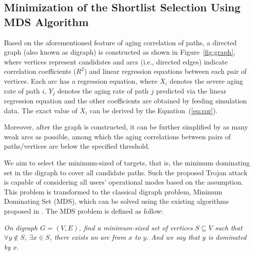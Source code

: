 \subsection{Minimization of the Shortlist Selection Using MDS Algorithm}
\label{sec:frame:mds}
Based on the aforementioned feature of aging correlation of paths, a directed graph (also known as digraph) is constructed as shown in Figure~\ref{fig:graph}, where vertices represent candidates and arcs (i.e., directed edges) indicate correlation coefficients ($R^2$) and linear regression equations between each pair of vertices. Each arc has a regression equation, where $X_{i}$ denotes the severe aging rate of path $i$, $Y_{j}$ denotes the aging rate of path $j$ predicted via the linear regression equation and the other coefficients are obtained by feeding simulation data. The exact value of $X_{i}$ can be derived by the Equation~(\ref{eq:cor}).

Moreover, after the graph is constructed, it can be further simplified by as many weak arcs as possible, among which the aging correlations between pairs of paths/vertices are below the specified threshold.

We aim to select the minimum-sized of targets, that is, the minimum dominating set in the digraph to cover all candidate paths. Such the proposed Trojan attack is capable of considering all users' operational modes based on the assumption. This problem is transformed to the classical digraph problem, Minimum Dominating Set (MDS), which can be solved using the existing algorithms proposed in \cite{ore1962theory}. The MDS problem is defined as follow:

\textit{On digraph $G = (V, E)$, find a minimum-sized set of vertices $S \subseteq V$ such that $\forall y \notin S$, $\exists x \in S$, there exists an arc from $x$ to $y$. And we say that $y$ is dominated by $x$}. 

